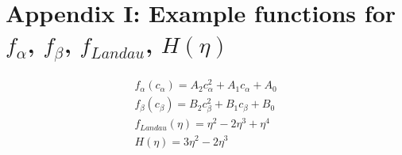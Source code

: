 \documentclass[11pt]{article}
\renewcommand{\=}[1]{\stackrel{#1}{=}} %
\theoremstyle{definition}
\theoremstyle{remark}
\begin{document}
\section*{Appendix I: Example functions for $f_{\alpha}$, $f_{\beta}$, $f_{Landau}$, $H(\eta)$ }
\begin{gather}
f_{\alpha}(c_{\alpha}) = A_{2} c_{\alpha}^2 + A_{1} c_{\alpha} + A_{0} \\
f_{\beta}(c_{\beta}) = B_{2} c_{\beta}^2 + B_{1} c_{\beta} + B_{0} \\
f_{Landau}(\eta) = \eta^2  - 2\eta^3 +  \eta^4\\
H(\eta) = 3 \eta^2 - 2 \eta^3
\end{gather}
\end{document}
